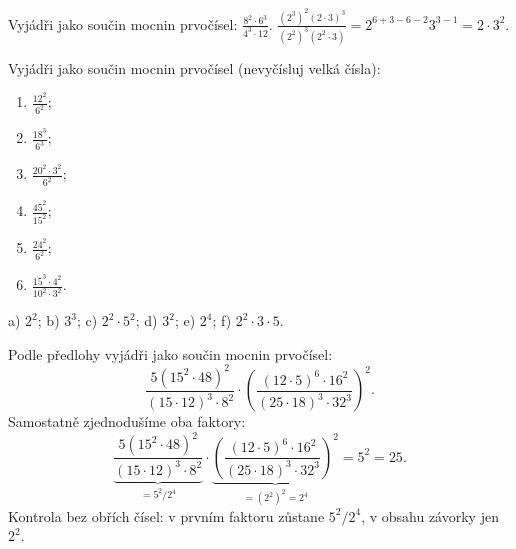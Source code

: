 \documentclass[11pt,a4paper]{article}
\begin{document}
\begin{prikladReseniBox}[title={Příklad 5},breakable=false]
Vyjádři jako součin mocnin prvočísel:
$\displaystyle\frac{8^2\cdot6^3}{4^3\cdot12}$.
\tcblower
$\displaystyle\frac{(2^3)^2(2\cdot3)^3}{(2^2)^3(2^2\cdot3)}
=2^{6+3-6-2}3^{3-1}=\boxed{2\cdot3^2}$.
\end{prikladReseniBox}
\begin{zadaniReseniBox}[title={Samostatná práce 5}]
Vyjádři jako součin mocnin prvočísel (nevyčísluj velká čísla):
\begin{enumerate}[label=\alph*)]
\item $\frac{12^2}{6^2}$; \item $\frac{18^3}{6^3}$;
\item $\frac{20^2\cdot3^2}{6^2}$;
\item $\frac{45^2}{15^2}$;
\item $\frac{24^2}{6^2}$;
\item $\frac{15^3\cdot4^2}{10^2\cdot3^2}$.
\end{enumerate}
\tcblower
 a) $2^2$; b) $3^3$; c) $2^2\cdot5^2$;
 d) $3^2$; e) $2^4$; f) $2^2\cdot3\cdot5$.
\end{zadaniReseniBox}
\begin{zadaniReseniBox}[title={Rozšíření 5}]
Podle předlohy vyjádři jako součin mocnin prvočísel:
\[
\frac{5(15^2\cdot48)^2}{(15\cdot12)^3\cdot8^2}\cdot
\left(\frac{(12\cdot5)^6\cdot16^2}{(25\cdot18)^3\cdot32^3}\right)^2.
\]
\tcblower
Samostatně zjednodušíme oba faktory:
\[
\underbrace{\frac{5(15^2\cdot48)^2}{(15\cdot12)^3\cdot8^2}}_{=5^2/2^4}
\cdot\underbrace{\left(\frac{(12\cdot5)^6\cdot16^2}{(25\cdot18)^3\cdot32^3}\right)^2}_{=(2^2)^2=2^4}
=\boxed{5^2=25}.
\]
Kontrola bez obřích čísel: v prvním faktoru zůstane $5^2/2^4$,
v obsahu závorky jen $2^2$.
\end{zadaniReseniBox}
\end{document}
